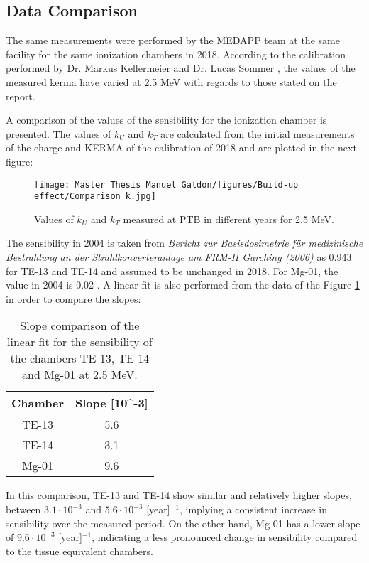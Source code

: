 \subsection{Data Comparison}

The same measurements were performed by the MEDAPP team at the same facility for the same ionization chambers in 2018. According to the calibration performed by Dr. Markus Kellermeier and Dr. Lucas Sommer \cite{ReportPTW2018}, the values of the measured kerma have varied at 2.5 \unit{\mega\electronvolt} with regards to those stated on the report. 

A comparison of the values of the sensibility for the ionization chamber is presented. The values of $k_U$ and $k_T$ are calculated from the initial measurements of the charge and KERMA of the calibration of 2018 \cite{ReportPTW2018} and are plotted in the next figure:

\begin{figure}[!h]
\centering
\begin{minipage}{0.8\textwidth}
    \centering
    \texttt{[image: Master Thesis Manuel Galdon/figures/Build-up effect/Comparison k.jpg]} 
    \caption{Values of $k_U$ and $k_T$ measured at PTB in different years for 2.5 \unit{\mega\electronvolt}.}
    \label{fig:Comparison of k at PTB}
\end{minipage}
\end{figure}

The sensibility in 2004 is taken from \textit{Bericht zur Basisdosimetrie für medizinische Bestrahlung an der Strahlkonverteranlage am FRM-II Garching (2006)} \cite{basisdosimetrieMEDAPP} as 0.943 for TE-13 and TE-14 and assumed to be unchanged in 2018. For Mg-01, the value in 2004 is 0.02 \cite{basisdosimetrieMEDAPP}. A linear fit is also performed from the data of the Figure \ref{fig:Comparison of k at PTB} in order to compare the slopes:
\newpage
\begin{table}[!h]
\centering
\begin{tabular}{|c|c|}
\hline
\rowcolor[HTML]{A9D9C6} 
Chamber & Slope [10^{-3}]\\ \hline
TE-13           & 5.6                                \\ \hline
TE-14           & 3.1                               \\ \hline
Mg-01           & 9.6                               \\ \hline
\end{tabular}
\caption{Slope comparison of the linear fit for the sensibility of the chambers TE-13, TE-14 and Mg-01 at 2.5 \unit{\mega\electronvolt}.}
\label{table: Slope comparison for MEDAPP source at the energy deposition. Neutrons}
\end{table}

In this comparison, TE-13 and TE-14 show similar and relatively higher slopes, between $3.1 \cdot 10^{-3}$ and $5.6 \cdot 10^{-3}$ [year]$^{-1}$, implying a consistent increase in sensibility over the measured period. On the other hand, Mg-01 has a lower slope of $9.6 \cdot 10^{-3}$ [year]$^{-1}$, indicating a less pronounced change in sensibility compared to the tissue equivalent chambers.